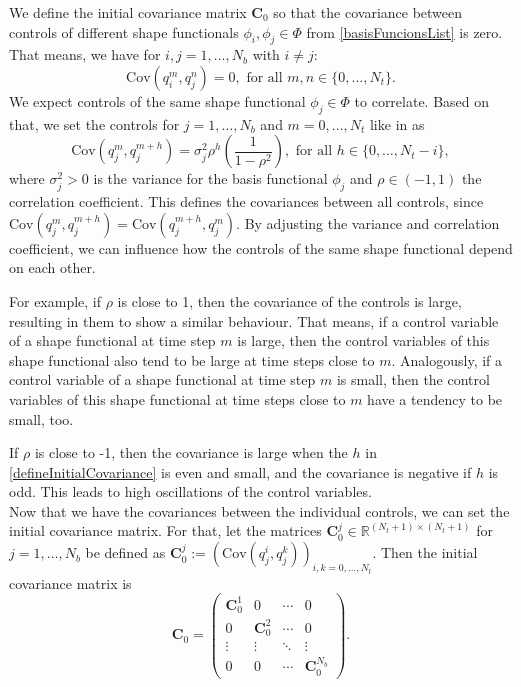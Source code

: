 We define the initial covariance matrix $\mathbf{C}_0$ so that the covariance between controls of different shape functionals $\phi_i,\phi_j\in\Phi$ from \eqref{basisFuncionsList} is zero. That means, we have for $i,j=1,\dotsc,N_b$ with $i\neq j$:
\begin{equation*}
\mathrm{Cov}(q_i^m,q_j^n)=0,\text{ for all }m,n\in\{0,\dotsc,N_t\}.
\end{equation*}
We expect controls of the same shape functional $\phi_j\in\Phi$ to correlate. Based on that, we set the controls for $j=1,\dotsc,N_b$ and $m=0,\dotsc,N_t$ like in \cite{Keil2022-dj} as
\begin{equation}
\label{defineInitialCovariance}
\mathrm{Cov}(q_j^m,q_j^{m+h})=\sigma_j^2\rho^h\left(\frac{1}{1-\rho^2}\right),\text{ for all }h\in\{0,\dotsc,N_t-i\},
\end{equation}
where $\sigma_j^2>0$ is the variance for the basis functional $\phi_j$ and $\rho\in(-1,1)$ the correlation coefficient. This defines the covariances between all controls, since $\mathrm{Cov}(q_j^m,q_j^{m+h})=\mathrm{Cov}(q_j^{m+h},q_j^m)$. By adjusting the variance and correlation coefficient, we can influence how the controls of the same shape functional depend on each other.

For example, if $\rho$ is close to 1, then the covariance of the controls is large, resulting in them to show a similar behaviour. That means, if a control variable of a shape functional at time step $m$ is large, then the control variables of this shape functional also tend to be large at time steps close to $m$. Analogously, if a control variable of a shape functional at time step $m$ is small, then the control variables of this shape functional at time steps close to $m$ have a tendency to be small, too.

If $\rho$ is close to -1, then the covariance is large when the $h$ in \eqref{defineInitialCovariance} is even and small, and the covariance is negative if $h$ is odd. This leads to high oscillations of the control variables.\\

Now that we have the covariances between the individual controls, we can set the initial covariance matrix. For that, let the matrices $\mathbf{C}^j_0\in\mathbb{R}^{(N_t+1)\times(N_t+1)}$ for $j=1,\dotsc,N_b$ be defined as $\mathbf{C}^j_0:=\left(\mathrm{Cov}(q_j^i,q_j^{k})\right)_{i,k=0,\dotsc,N_t}$. Then the initial covariance matrix is
\begin{equation}
\label{initCov}
\mathbf{C}_0 =
\begin{pmatrix}
  \mathbf{C}^1_0 & 0 & \cdots & 0 \\
  0 & \mathbf{C}^2_0 & \cdots & 0 \\
  \vdots  & \vdots  & \ddots & \vdots  \\
  0 & 0 & \cdots & \mathbf{C}^{N_b}_0 
 \end{pmatrix}.
\end{equation}
\\

